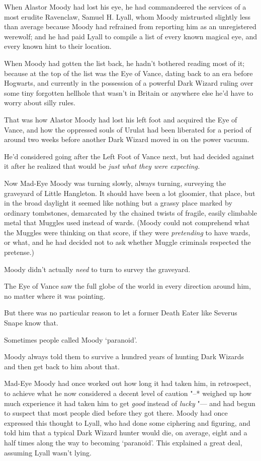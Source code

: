 When Alastor Moody had lost his eye, he had commandeered the services of
a most erudite Ravenclaw, Samuel H. Lyall, whom Moody mistrusted
slightly less than average because Moody had refrained from reporting
him as an unregistered werewolf; and he had paid Lyall to compile a list
of every known magical eye, and every known hint to their location.

When Moody had gotten the list back, he hadn't bothered reading most of
it; because at the top of the list was the Eye of Vance, dating back to
an era before Hogwarts, and currently in the possession of a powerful
Dark Wizard ruling over some tiny forgotten hellhole that wasn't in
Britain or anywhere else he'd have to worry about silly rules.

That was how Alastor Moody had lost his left foot and acquired the Eye
of Vance, and how the oppressed souls of Urulat had been liberated for a
period of around two weeks before another Dark Wizard moved in on the
power vacuum.

He'd considered going after the Left Foot of Vance next, but had decided
against it after he realized that would be \emph{just what they were
expecting.}

Now Mad-Eye Moody was turning slowly, always turning, surveying the
graveyard of Little Hangleton. It should have been a lot gloomier, that
place, but in the broad daylight it seemed like nothing but a grassy
place marked by ordinary tombstones, demarcated by the chained twists of
fragile, easily climbable metal that Muggles used instead of wards.
(Moody could not comprehend what the Muggles were thinking on that
score, if they were \emph{pretending} to have wards, or what, and he had
decided not to ask whether Muggle criminals respected the pretense.)

Moody didn't actually \emph{need} to turn to survey the graveyard.

The Eye of Vance saw the full globe of the world in every direction
around him, no matter where it was pointing.

But there was no particular reason to let a former Death Eater like
Severus Snape know that.

Sometimes people called Moody `paranoid'.

Moody always told them to survive a hundred years of hunting Dark
Wizards and then get back to him about that.

Mad-Eye Moody had once worked out how long it had taken him, in
retrospect, to achieve what he now considered a decent level of caution
"--* weighed up how much experience it had taken him to get \emph{good}
instead of \emph{lucky} "--- and had begun to suspect that most people died
before they got there. Moody had once expressed this thought to Lyall,
who had done some ciphering and figuring, and told him that a typical
Dark Wizard hunter would die, on average, eight and a half times along
the way to becoming `paranoid'. This explained a great deal, assuming
Lyall wasn't lying.

